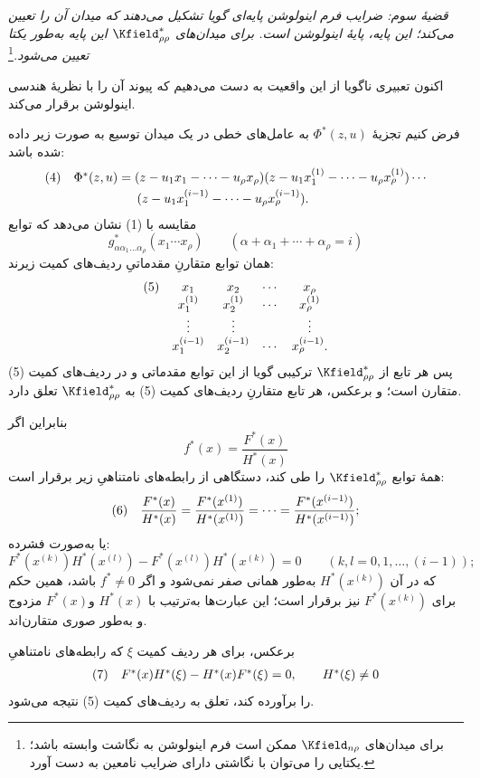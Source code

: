 \documentclass[11pt]{article}
\newcommand{\srcLTR}[1]{\relax\ifmmode\text{\mbox{\babelsublr{\foreignlanguage{english}{#1}}}}\else\babelsublr{\foreignlanguage{english}{#1}}\fi}
\newcommand{\srcfn}[2]{\begingroup\renewcommand{\thefootnote}{\srcLTR{#1}}\footnote{#2}\addtocounter{footnote}{-1}\endgroup}
\begin{document}
\emph{قضیهٔ سوم: ضرایب فرم اینولوشن پایه‌ای گویا تشکیل می‌دهند که میدان آن را تعیین می‌کند؛ این پایه، پایهٔ اینولوشن است. برای میدان‌های $\Kfield^*_{\rho\rho}$ این پایه به‌طور یکتا تعیین می‌شود.}\srcfn{*)}{برای میدان‌های $\Kfield_{n\rho}$ ممکن است فرم اینولوشن به نگاشت وابسته باشد؛ یکتایی را می‌توان با نگاشتی دارای ضرایب نامعین به دست آورد.}

اکنون تعبیری ناگویا از این واقعیت به دست می‌دهیم که پیوند آن را با نظریهٔ هندسی اینولوشن برقرار می‌کند.

فرض کنیم تجزیهٔ $\Phi^*(z,u)$ به عامل‌های خطی در یک میدان توسیع به صورت زیر داده شده باشد:
\[
\begin{array}{@{}l@{\quad}l@{}}
(4)& \Phi^*(z,u)=(z-u_1x_1-\cdots-u_\rho x_\rho)(z-u_1x_1^{(1)}-\cdots-u_\rho x_\rho^{(1)})\cdots\\[0.25em]
& \qquad\qquad\quad (z-u_1x_1^{(i-1)}-\cdots-u_\rho x_\rho^{(i-1)}).
\end{array}
\]
مقایسه با (1) نشان می‌دهد که توابع
\[
g^*_{\alpha\alpha_1\ldots\alpha_\rho}(x_1\cdots x_\rho)\qquad(\alpha+\alpha_1+\cdots+\alpha_\rho=i)
\]
همان توابع متقارنِ مقدماتیِ ردیف‌های کمیت زیرند:
\[
\begin{array}{@{}l@{\quad}cccc@{}}
(5)&x_1&x_2&\cdots&x_\rho\\
&x_1^{(1)}&x_2^{(1)}&\cdots&x_\rho^{(1)}\\
&\vdots&\vdots&&\vdots\\
&x_1^{(i-1)}&x_2^{(i-1)}&\cdots&x_\rho^{(i-1)}.
\end{array}
\]
پس هر تابع از $\Kfield^*_{\rho\rho}$ ترکیبی گویا از این توابع مقدماتی و در ردیف‌های کمیت (5) متقارن است؛ و برعکس، هر تابع متقارنِ ردیف‌های کمیت (5) به $\Kfield^*_{\rho\rho}$ تعلق دارد.

بنابراین اگر
\[
f^*(x)=\frac{F^*(x)}{H^*(x)}
\]
همهٔ توابع $\Kfield^*_{\rho\rho}$ را طی کند، دستگاهی از رابطه‌های نامتناهیِ زیر برقرار است:
\[
\begin{array}{@{}l@{\quad}c@{}}
(6)&\displaystyle \frac{F^*(x)}{H^*(x)}=\frac{F^*(x^{(1)})}{H^*(x^{(1)})}=\cdots=\frac{F^*(x^{(i-1)})}{H^*(x^{(i-1)})};
\end{array}
\]
یا به‌صورت فشرده:
\[
F^*(x^{(k)})H^*(x^{(l)})-F^*(x^{(l)})H^*(x^{(k)})=0\qquad(k,l=0,1,\ldots,(i-1));
\]
که در آن $H^*(x^{(k)})$ به‌طور همانی صفر نمی‌شود و اگر $f^*\ne0$ باشد، همین حکم برای $F^*(x^{(k)})$ نیز برقرار است؛ این عبارت‌ها به‌ترتیب با $H^*(x)$ و$F^*(x)$ مزدوج و به‌طور صوری متقارن‌اند.

برعکس، برای هر ردیف کمیت $\xi$ که رابطه‌های نامتناهیِ
\[
\begin{array}{@{}l@{\quad}c@{}}
(7)&F^*(x)H^*(\xi)-H^*(x)F^*(\xi)=0,\qquad H^*(\xi)\ne0
\end{array}
\]
را برآورده کند، تعلق به ردیف‌های کمیت (5) نتیجه می‌شود.
\end{document}
